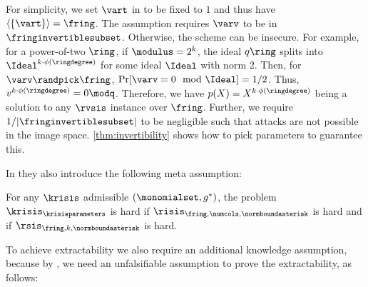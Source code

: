 \begin{remark}
For simplicity, we set $\vart$ in  \cite[Def 23]{C:ACLMT22} to be fixed to $1$ and thus have $\langle \{\vart\}\rangle = \fring$. The \krisis assumption requires $\varv$ to be in $\fringinvertiblesubset$. Otherwise, the scheme can be insecure.  For example, for a power-of-two $\ring$, if $\modulus = 2^k$, the ideal $q\ring$ splits into $\Ideal^{k \cdot \phi(\ringdegree)}$ for some ideal $\Ideal$ with norm 2.  Then, for $\varv \randpick \fring$, $\Pr[\varv = 0 \mod \Ideal] = 1/2$. Thus, $v^{k \cdot \phi(\ringdegree)} = 0 \modq$.  Therefore, we have $p(X) = X^{k \cdot \phi(\ringdegree)}$ being a solution to any $\rvsis$ instance over $\fring$. Further, we require $1/|\fringinvertiblesubset|$ to be negligible such that \sis attacks are not possible in the image space. \cref{thm:invertibility} shows how to pick parameters to guarantee this.
\end{remark}


\noindent In \cite{C:ACLMT22} they also introduce the following meta assumption:

\begin{assumption}
\label{def:meta}
For any $\krisis$ admissible $(\monomialset, g^*)$, the problem $\krisis_{\krisisparameters}$ is hard if $\risis_{\fring, \numcols, \normboundasterisk}$ is hard and if $\rsis_{\fring, k, \normboundasterisk}$ is hard.
\end{assumption}

\noindent To achieve extractability we also require an additional knowledge assumption,
because by \cite{STOC:GenWic11}, we need an unfalsifiable assumption to prove the extractability,
as follows:

